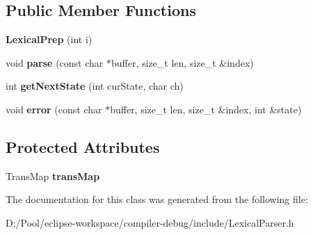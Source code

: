 \subsection*{Public Member Functions}
\begin{DoxyCompactItemize}
\item 
\mbox{\label{classx2_1_1_lexical_prep_ad13cec8bb420d73eeee81a9ec179b1a1}} 
{\bfseries Lexical\+Prep} (int i)
\item 
\mbox{\label{classx2_1_1_lexical_prep_ab53c6c59c506b4622f9f9cb98c334c95}} 
void {\bfseries parse} (const char $\ast$buffer, size\+\_\+t len, size\+\_\+t \&index)
\item 
\mbox{\label{classx2_1_1_lexical_prep_aaa47b259983af53f1b7731c3577f24c2}} 
int {\bfseries get\+Next\+State} (int cur\+State, char ch)
\item 
\mbox{\label{classx2_1_1_lexical_prep_abde0d268131038bd92c45b0e1d686fa8}} 
void {\bfseries error} (const char $\ast$buffer, size\+\_\+t len, size\+\_\+t \&index, int \&state)
\end{DoxyCompactItemize}
\subsection*{Protected Attributes}
\begin{DoxyCompactItemize}
\item 
\mbox{\label{classx2_1_1_lexical_prep_a0e6e7b8dc9e35fbc65db5c95359a156e}} 
Trans\+Map {\bfseries trans\+Map}
\end{DoxyCompactItemize}


The documentation for this class was generated from the following file\+:\begin{DoxyCompactItemize}
\item 
D\+:/\+Pool/eclipse-\/workspace/compiler-\/debug/include/Lexical\+Parser.\+h\end{DoxyCompactItemize}
